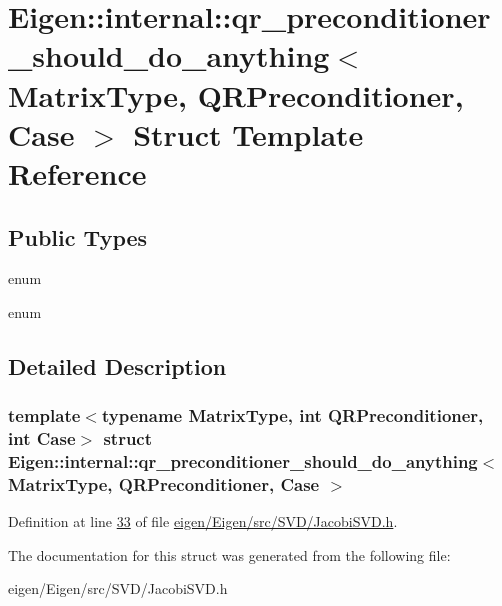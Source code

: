 \hypertarget{struct_eigen_1_1internal_1_1qr__preconditioner__should__do__anything}{}\section{Eigen\+:\+:internal\+:\+:qr\+\_\+preconditioner\+\_\+should\+\_\+do\+\_\+anything$<$ Matrix\+Type, Q\+R\+Preconditioner, Case $>$ Struct Template Reference}
\label{struct_eigen_1_1internal_1_1qr__preconditioner__should__do__anything}
\subsection*{Public Types}
\begin{DoxyCompactItemize}
\item 
\mbox{\label{struct_eigen_1_1internal_1_1qr__preconditioner__should__do__anything_a251c6de3858581704a03729d0e6777ca}} 
enum 
\item 
\mbox{\label{struct_eigen_1_1internal_1_1qr__preconditioner__should__do__anything_a71de1085c6fa5077bcba239e6b4b0d04}} 
enum 
\end{DoxyCompactItemize}


\subsection{Detailed Description}
\subsubsection*{template$<$typename Matrix\+Type, int Q\+R\+Preconditioner, int Case$>$\newline
struct Eigen\+::internal\+::qr\+\_\+preconditioner\+\_\+should\+\_\+do\+\_\+anything$<$ Matrix\+Type, Q\+R\+Preconditioner, Case $>$}



Definition at line \hyperlink{eigen_2_eigen_2src_2_s_v_d_2_jacobi_s_v_d_8h_source_l00033}{33} of file \hyperlink{eigen_2_eigen_2src_2_s_v_d_2_jacobi_s_v_d_8h_source}{eigen/\+Eigen/src/\+S\+V\+D/\+Jacobi\+S\+V\+D.\+h}.



The documentation for this struct was generated from the following file\+:\begin{DoxyCompactItemize}
\item 
eigen/\+Eigen/src/\+S\+V\+D/\+Jacobi\+S\+V\+D.\+h\end{DoxyCompactItemize}
